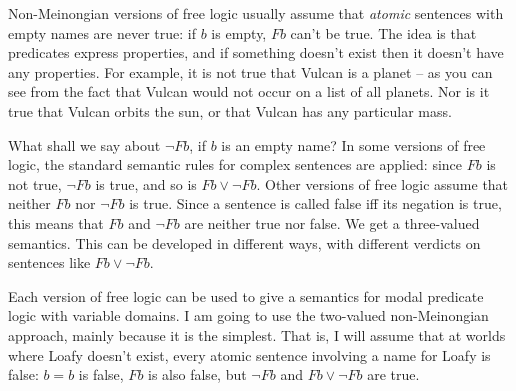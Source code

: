 Non-Meinongian versions of free logic usually assume that \emph{atomic}
sentences with empty names are never true: if $b$ is empty, $Fb$ can't be
true. The idea is that predicates express properties, and if something doesn't
exist then it doesn't have any properties. For example, it is not true that
Vulcan is a planet -- as you can see from the fact that Vulcan would not occur
on a list of all planets. Nor is it true that Vulcan orbits the sun, or that
Vulcan has any particular mass.


What shall we say about $\neg Fb$, if $b$ is an empty name? In some versions of
free logic, the standard semantic rules for complex sentences are applied: since
$Fb$ is not true, $\neg Fb$ is true, and so is $Fb \lor \neg Fb$. Other versions
of free logic assume that neither $Fb$ nor $\neg Fb$ is true. Since a
sentence is called false iff its negation is true, this means that $Fb$ and
$\neg Fb$ are neither true nor false. We get a three-valued semantics. This can
be developed in different ways, with different verdicts on sentences like
$Fb \lor \neg Fb$.

Each version of free logic can be used to give a semantics for modal predicate
logic with variable domains. I am going to use the two-valued non-Meinongian
approach, mainly because it is the simplest. That is, I will assume that at worlds where
Loafy doesn't exist, every atomic sentence involving a name for Loafy is false:
$b=b$ is false, $Fb$ is also false, but $\neg Fb$ and $Fb \lor \neg Fb$ are
true.


